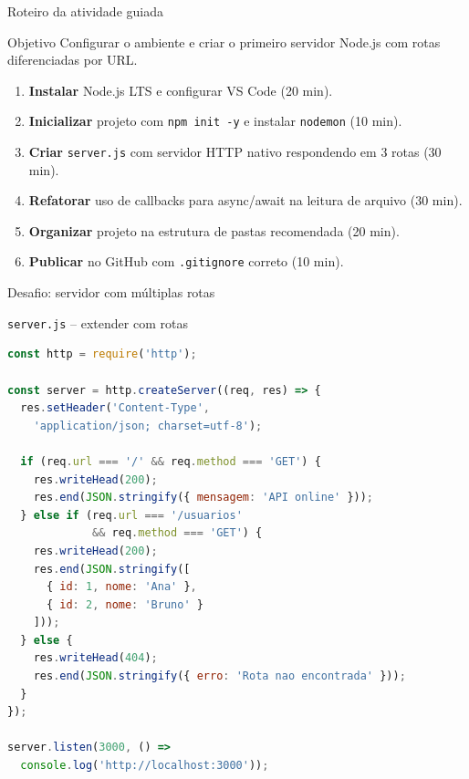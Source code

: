 \documentclass[aspectratio=169]{beamer}
\newcommand{\code}[1]{\texttt{#1}}
\begin{document}
\begin{frame}{Roteiro da atividade guiada}
\begin{block}{Objetivo}
Configurar o ambiente e criar o primeiro servidor Node.js com rotas diferenciadas por URL.
\end{block}
\begin{enumerate}
  \item \textbf{Instalar} Node.js LTS e configurar VS Code (20 min).
  \item \textbf{Inicializar} projeto com \code{npm init -y} e instalar \code{nodemon} (10 min).
  \item \textbf{Criar} \code{server.js} com servidor HTTP nativo respondendo em 3 rotas (30 min).
  \item \textbf{Refatorar} uso de callbacks para async/await na leitura de arquivo (30 min).
  \item \textbf{Organizar} projeto na estrutura de pastas recomendada (20 min).
  \item \textbf{Publicar} no GitHub com \code{.gitignore} correto (10 min).
\end{enumerate}
\end{frame}

\begin{frame}[fragile]{Desafio: servidor com m\'ultiplas rotas}
\begin{block}{\code{server.js} -- extender com rotas}
\begin{lstlisting}[language=JavaScript]
const http = require('http');

const server = http.createServer((req, res) => {
  res.setHeader('Content-Type',
    'application/json; charset=utf-8');

  if (req.url === '/' && req.method === 'GET') {
    res.writeHead(200);
    res.end(JSON.stringify({ mensagem: 'API online' }));
  } else if (req.url === '/usuarios'
             && req.method === 'GET') {
    res.writeHead(200);
    res.end(JSON.stringify([
      { id: 1, nome: 'Ana' },
      { id: 2, nome: 'Bruno' }
    ]));
  } else {
    res.writeHead(404);
    res.end(JSON.stringify({ erro: 'Rota nao encontrada' }));
  }
});

server.listen(3000, () =>
  console.log('http://localhost:3000'));
\end{lstlisting}
\end{block}
\end{frame}
\end{document}
